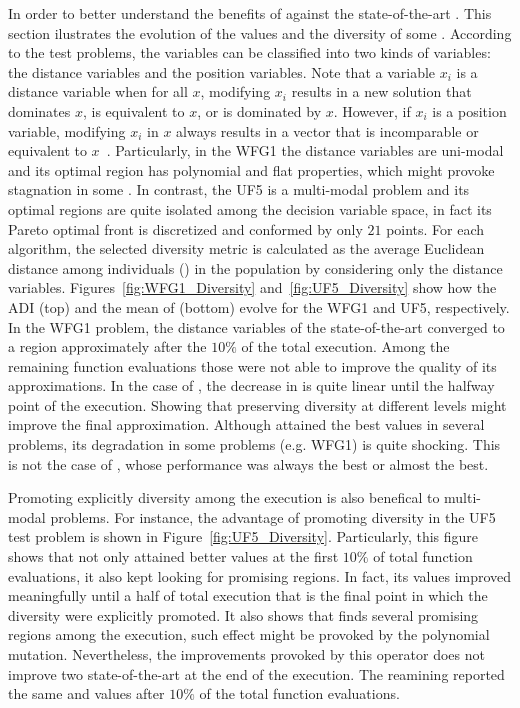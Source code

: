 In order to better understand the benefits of \AVSDMOEAD{} against the state-of-the-art \MOEAS{}.
%
This section ilustrates the evolution of the \HV{} values and the diversity of some \MOPS{}.
%
According to the \WFG{} test problems, the variables can be classified into two kinds of variables: the distance variables and the position variables.
%
Note that a variable $x_i$ is a distance variable when for all $x$, modifying $x_i$ results in a new solution that dominates $x$, is equivalent to $x$, or is dominated by $x$.
%
However, if $x_i$ is a position variable, modifying $x_i$ in $x$ always results in a vector that is incomparable or equivalent to $x$~\cite{huband2006review}.
%
Particularly, in the WFG1 the distance variables are uni-modal and its optimal region has polynomial and flat properties, which might provoke stagnation in some \MOEAS{}.
%
In contrast, the UF5 is a multi-modal problem and its optimal regions are quite isolated among the decision variable space, in fact its Pareto optimal front is discretized and conformed by only $21$ points.
%
%
For each algorithm, the selected diversity metric is calculated as the average Euclidean distance among individuals (\ADI{}) in the population by considering only the distance variables.
%
Figures~\ref{fig:WFG1_Diversity} and~\ref{fig:UF5_Diversity} show how the ADI (top) and the mean of \HV{} (bottom) evolve for the WFG1 and UF5, respectively.
%
In the WFG1 problem, the distance variables of the state-of-the-art \MOEAS{} converged to a region approximately after the $10\%$ of the total execution.
%
Among the remaining function evaluations those \MOEAS{} were not able to improve the quality of its approximations.
%
In the case of \AVSDMOEAD{}, the decrease in \ADI{} is quite linear until the halfway point of the execution.
%
Showing that preserving diversity at different levels might improve the final approximation.
%
Although \RMOEA{} attained the best \HV{} values in several problems, its degradation in some problems (e.g. WFG1) is quite shocking.
%
This is not the case of \AVSDMOEAD{}, whose performance was always the best or almost the best.
%

Promoting explicitly diversity among the execution is also benefical to multi-modal problems.
%
For instance, the advantage of promoting diversity in the UF5 test problem is shown in Figure~\ref{fig:UF5_Diversity}.
%
Particularly, this figure shows that \AVSDMOEAD{} not only attained better \HV{} values at the first $10\%$ of total function evaluations, it also kept looking for promising regions.
%
In fact, its \HV{} values improved meaningfully until a half of total execution that is the final point in which the diversity were explicitly promoted.
%
It also shows that \MOEADDE{} finds several promising regions among the execution, such effect might be provoked by the polynomial mutation.
%
Nevertheless, the improvements provoked by this operator does not improve two state-of-the-art \MOEAS{} at the end of the execution.
%
The reamining \MOEAS{} reported the same \HV{} and \ADI{} values after $10\%$ of the total function evaluations.


